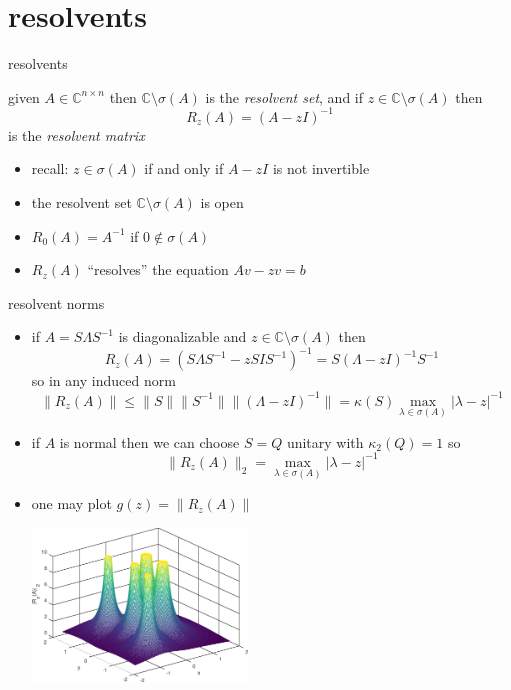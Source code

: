 \documentclass[10pt,hyperref]{beamer}
\newcommand{\CC}{\mathbb{C}}
\begin{document}
\section{resolvents}

\begin{frame}{resolvents}

\begin{definition}
given $A\in\CC^{n\times n}$ then $\CC\setminus \sigma(A)$ is the \emph{resolvent set}, and if $z \in \CC\setminus \sigma(A)$ then
    $$R_z(A) = \left(A-z I\right)^{-1}$$
is the \emph{resolvent matrix}
\end{definition}

\begin{itemize}
\item recall: $z \in \sigma(A)$ if and only if $A-z I$ is not invertible
\item the resolvent set $\CC\setminus \sigma(A)$ is open
\item $R_0(A)=A^{-1}$ if $0\notin\sigma(A)$
\item $R_z(A)$ ``resolves'' the equation $Av-z v=b$
\end{itemize}
\end{frame}


\begin{frame}{resolvent norms}

\begin{itemize}
\item if $A=S\Lambda S^{-1}$ is diagonalizable and $z\in \CC\setminus \sigma(A)$ then
    $$R_z(A) = \left(S\Lambda S^{-1}-z S I S^{-1}\right)^{-1} = S \left(\Lambda - z I\right)^{-1} S^{-1}$$
so in any induced norm
    $$\|R_z(A)\| \le \|S\|\|S^{-1}\|\|\left(\Lambda - z I\right)^{-1}\| = \kappa(S) \max_{\lambda\in\sigma(A)} |\lambda-z|^{-1}$$
\item if $A$ is normal then we can choose $S=Q$ unitary with $\kappa_2(Q)=1$ so
    $$\|R_z(A)\|_2 = \max_{\lambda\in\sigma(A)} |\lambda-z|^{-1}$$
\item one may plot $g(z)=\|R_z(A)\|$

\vspace{-5mm}
\hfill \includegraphics[width=0.45\textwidth]{figs/resolvesurf}
\end{itemize}
\end{frame}
\end{document}
